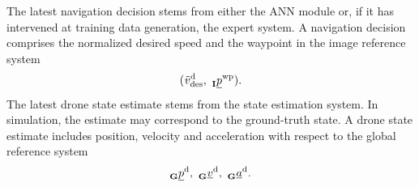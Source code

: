 The latest navigation decision
stems from either the ANN module
or, if it has intervened at training data generation,
the expert system.
A navigation decision comprises the normalized desired speed 
and the waypoint in the image reference system
\begin{equation}
    (
        \speed[\norm]{\drone}{\desired}{}{}
        ,\ 
        \pos[]{\wayp}{}{\irs}{}
    ).
\end{equation}
The latest drone state estimate stems from the state estimation system.
In simulation, the estimate may correspond to the ground-truth state.
A drone state estimate includes position, velocity and acceleration
with respect to the global reference system
\begin{equation} \label{eq:drone_state}
    \pos[]{\drone}{}{\grs}{}
    ,\ 
    \vel[]{\drone}{}{\grs}{}
    ,\ 
    \acc[]{\drone}{}{\grs}{}.
\end{equation}


